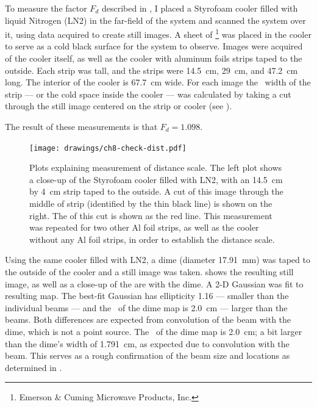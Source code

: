 To measure the factor $F_d$ described in , I placed a Styrofoam cooler filled with liquid Nitrogen (LN2) in the far-field of the system and scanned the system over it, using data acquired to create still images.
A sheet of \ecco\footnote{Emerson \& Cuming Microwave Products, Inc.} was placed in the cooler to serve as a cold black surface for the system to observe.
Images were acquired of the cooler itself, as well as the cooler with aluminum foils strips taped to the outside.
Each strip was  tall, and the strips were \SI{14.5}{\cm}, \SI{29}{\cm}, and \SI{47.2}{\cm} long.
The interior of the cooler is \SI{67.7}{\cm} wide.
For each image the \FWHM\ width of the strip --- or the cold space inside the cooler --- was calculated by taking a cut through the still image centered on the strip or cooler (see ).

The result of these measurements is that $F_d = 1.098$.

\begin{figure}
\centering
\texttt{[image: drawings/ch8-check-dist.pdf]}
\caption{
  Plots explaining measurement of distance scale.
  The left plot shows a close-up of the Styrofoam cooler filled with LN2, with an \SI{14.5}{\cm} by \SI{4}{\cm} strip taped to the outside.
  A cut of this image through the middle of strip (identified by the thin black line) is shown on the right.
  The \FWHM of this cut is shown as the red line.
  This measurement was repeated for two other Al foil strips, as well as the cooler without any Al foil strips, in order to establish the distance scale.
}
\label{fig:ch8-check-dist}
\end{figure}


Using the same cooler filled with LN2, a dime (diameter \SI{17.91}{\mm}) was taped to the outside of the cooler and a still image was taken.
 shows the resulting still image, as well as a close-up of the are with the dime.
A 2-D Gaussian was fit to resulting map.
The best-fit Gaussian has ellipticity 1.16 --- smaller than the individual beams --- and the \FWHM\ of the dime map is \SI{2.0}{\cm} --- larger than the beams.
Both differences are expected from convolution of the beam with the dime, which is not a point source.
The \FWHM\ of the dime map is \SI{2.0}{\cm}; a bit larger than the dime's width of \SI{1.791}{\cm}, as expected due to convolution with the beam.
This serves as a rough confirmation of the beam size and locations as determined in .


